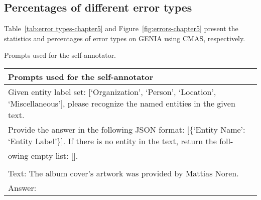 \subsection{Percentages of different error types}

Table~\ref{tab:error types-chapter5} and Figure~\ref{fig:errors-chapter5} present the statistics and percentages of error types on GENIA using \ac{CMAS}, respectively.




\begin{prompt*}[t]
	\centering
	\caption{Prompts used for the self-annotator.}
	\label{tab:self-annotation-chapter5}
	\begin{tabular}{l}
		\toprule
		Prompts used for the self-annotator\\ 
		\midrule
            Given entity label set: {[}`Organization', `Person', `Location', `Miscellaneous'{]},  
		please 
            recognize the named entities in the given text. \\ Provide the answer in the following JSON format: [\{`Entity Name': `Entity Label'\}]. If there is no entity in the text, return the foll-\\owing empty list: [].
		\\
            \\
		Text: The album cover's artwork was provided by Mattias Noren.\\
		Answer: \\
        \bottomrule
	\end{tabular}
\end{prompt*}


